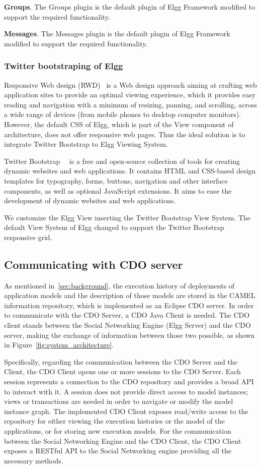 \textbf{Groups}. The Groups plugin is the default plugin of Elgg Framework modified to support the required functionality.

\textbf{Messages}. The Messages plugin is the default plugin of Elgg Framework modified to support the required functionality.

\subsubsection{Twitter bootstraping of Elgg}
Responsive Web design (RWD)~\cite{natda2013responsive} is a Web design approach aiming at crafting web application sites to provide an optimal viewing experience, which it provides easy reading and navigation with a minimum of resizing, panning, and scrolling, across a wide range of devices (from mobile phones to desktop computer monitors). However, the default CSS of Elgg, which is part of the View component of architecture, does not offer responsive web pages. Thus the ideal solution is to integrate Twitter Bootstrap to Elgg Viewing System. 

Twitter Bootstrap~\cite{twitter_bootstrap}~\cite{cochran2012twitter} is a free and open-source collection of tools for creating dynamic websites and web applications. It contains HTML and CSS-based design templates for typography, forms, buttons, navigation and other interface components, as well as optional JavaScript extensions. It aims to ease the development of dynamic websites and web applications. 

We customize the Elgg View inserting the Twitter Bootstrap View System. The default View System of Elgg changed to support the Twitter Bootstrap responsive grid.

\subsection{Communicating with CDO server}
\label{sec:cdo_comm}
As mentioned in~\ref{sec:background}, the execution history of deployments of application models and the description of those models are stored in the CAMEL information repository, which is implemented as an Eclipse CDO server. In order to communicate with the CDO Server, a CDO Java Client is needed. The CDO client stands between the Social Networking Engine (Elgg Server) and the CDO server, making the exchange of information between those two possible, as shown in Figure~\ref{fig:system_architecture}.

Specifically, regarding the communication between the CDO Server and the Client, the CDO Client opens one or more sessions to the CDO Server. Each session represents a connection to the CDO repository and provides a broad API to interact with it. A session does not provide direct access to model instances; views or transactions are needed in order to navigate or modify the model instance graph. The implemented CDO Client exposes read/write access to the repository for either viewing the execution histories or the model of the applications, or for storing new execution models. For the communication between the Social Networking Engine and the CDO Client, the CDO Client exposes a RESTful API to the Social Networking engine providing all the necessary methods. 

